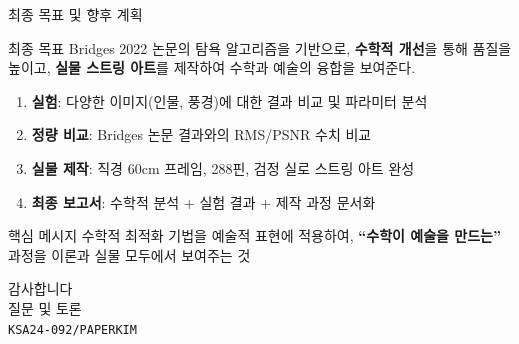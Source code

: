 \documentclass[10pt,aspectratio=169]{beamer}
\begin{document}
\begin{frame}{최종 목표 및 향후 계획}
  \begin{block}{최종 목표}
    Bridges 2022 논문의 탐욕 알고리즘을 기반으로,
    \textbf{수학적 개선}을 통해 품질을 높이고,
    \textbf{실물 스트링 아트}를 제작하여
    수학과 예술의 융합을 보여준다.
  \end{block}

  \vspace{0.3cm}
  \begin{enumerate}
    \item \textbf{실험}: 다양한 이미지(인물, 풍경)에 대한 결과 비교 및 파라미터 분석
    \item \textbf{정량 비교}: Bridges 논문 결과와의 RMS/PSNR 수치 비교
    \item \textbf{실물 제작}: 직경 60cm 프레임, 288핀, 검정 실로 스트링 아트 완성
    \item \textbf{최종 보고서}: 수학적 분석 + 실험 결과 + 제작 과정 문서화
  \end{enumerate}

  \vspace{0.3cm}
  \begin{alertblock}{핵심 메시지}
    수학적 최적화 기법을 예술적 표현에 적용하여,
    \textbf{``수학이 예술을 만드는''} 과정을
    이론과 실물 모두에서 보여주는 것
  \end{alertblock}
\end{frame}

\begin{frame}
  \centering
  \vspace{2cm}
  {\Huge 감사합니다}\\[1cm]
  {\large 질문 및 토론}\\[0.5cm]
  {\small\texttt{KSA24-092/PAPERKIM}}
\end{frame}
\end{document}

